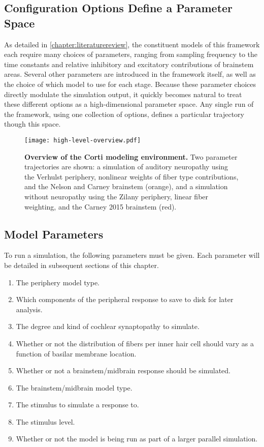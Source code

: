 \subsection{Configuration Options Define a Parameter Space}
As detailed in \autoref{chapter:literaturereview}, the constituent models of this framework each require many choices of parameters, ranging from sampling frequency to the time constants and relative inhibitory and excitatory contributions of brainstem areas. Several other parameters are introduced in the framework itself, as well as the choice of which model to use for each stage. Because these parameter choices directly modulate the simulation output, it quickly becomes natural to treat these different options as a high-dimensional parameter space.  Any single run of the framework, using one collection of options, defines a particular trajectory though this space.

\begin{figure}[htbp]
	\centering
	\texttt{[image: high-level-overview.pdf]}
	\caption[Overview of the Corti Modeling Environment.]{\textbf{Overview of the Corti modeling environment.} Two parameter trajectories are shown: a simulation of auditory neuropathy using the Verhulst periphery, nonlinear weights of fiber type contributions, and the Nelson and Carney brainstem (orange), and a simulation without neuropathy using the Zilany periphery, linear fiber weighting, and the Carney 2015 brainstem (red).}
	\label{fig:corti-overview}
	\end{figure}

\subsection{Model Parameters} %
\label{sub:model_parameters}
To run a simulation, the following parameters must be given.  Each parameter will be detailed in subsequent sections of this chapter. 

\begin{enumerate}
	\item The periphery model type.
	\item Which components of the peripheral response to save to disk for later analysis.
	\item The degree and kind of cochlear synaptopathy to simulate.
	\item Whether or not the distribution of fibers per inner hair cell should vary as a function of basilar membrane location.
	\item Whether or not a brainstem/midbrain response should be simulated.
	\item The brainstem/midbrain model type.
	\item The stimulus to simulate a response to. 
	\item The stimulus level.
	\item Whether or not the model is being run as part of a larger parallel simulation.
\end{enumerate}

